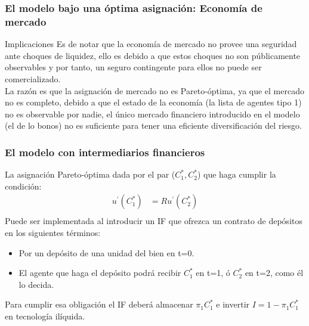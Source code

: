 \documentclass[10pt, xcolor=table, x11names]{beamer}
\begin{document}
\begin{frame}
    \frametitle{{\normalsize El modelo bajo una óptima asignación: Economía de mercado } {}}
    
     \begin{block} {Implicaciones}
       Es de notar que la economía de mercado no provee una seguridad ante choques de liquidez, ello es debido a que estos choques no son públicamente observables y por tanto, un seguro contingente para ellos no puede ser comercializado.\\
       La razón es que la asignación de mercado no es Pareto-óptima, ya que el mercado no es completo, debido a que el estado de la economía (la lista de agentes tipo 1) no es observable por nadie, el único mercado financiero introducido en el modelo (el de lo bonos) no es suficiente para tener una eficiente diversificación del riesgo.
        
    \end{block}	
    
\end{frame}

\begin{frame}
    \frametitle{{\normalsize El modelo con intermediarios financieros } {}}
    
    La asignación Pareto-óptima dada por el par ($C_{1}^{*}, C_{2}^{*}$) que haga cumplir la condición:
    \begin{align}
    u^{'}(C_{1}^{*})&=Ru^{'}(C_{2}^{*})\nonumber \\
    \end{align}
    Puede ser implementada al introducir un IF que ofrezca un contrato de depósitos en los siguientes términos:
    \begin{itemize}
        \item Por un depósito de una unidad del bien en t=0.
        \item El agente que haga el depósito podrá recibir $C_{1}^{*}$ en t=1, ó $ C_{2}^{*}$ en t=2, como él lo decida.
     \end{itemize}
 Para cumplir esa obligación el IF deberá almacenar $\pi_{1}C_{1}^{*} $ e invertir $I=1-\pi_{1}C_{1}^{*}$ en tecnología ilíquida.
\end{frame}
\end{document}
